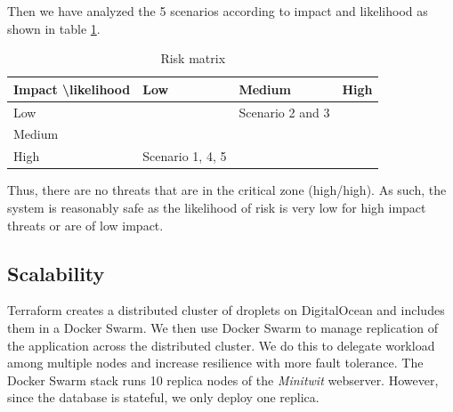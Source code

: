 Then we have analyzed the 5 scenarios according to impact and likelihood as shown in table \ref{riskMatrix}.

\begin{table}[H]
\centering
\begin{tabular}{|l|l|l|l|}
\hline
Impact \textbackslash likelihood & Low              & Medium           & High \\ \hline
Low                              &                  & Scenario 2 and 3 &      \\ \hline
Medium                           &                  &                  &      \\ \hline
High                             & Scenario 1, 4, 5 &                  &      \\ \hline
\end{tabular}
\caption{Risk matrix}
\label{riskMatrix}
\end{table}

Thus, there are no threats that are in the critical zone (high/high). As such, the system is reasonably safe as the likelihood of risk is very low for high impact threats or are of low impact.


\subsection{Scalability}
Terraform creates a distributed cluster of droplets on DigitalOcean and includes them in a Docker Swarm.
We then use Docker Swarm to manage replication of the application across the distributed cluster.
We do this to delegate workload among multiple nodes and increase resilience with more fault tolerance.
The Docker Swarm stack runs 10 replica nodes of the \textit{Minitwit} webserver.
However, since the database is stateful, we only deploy one replica.
